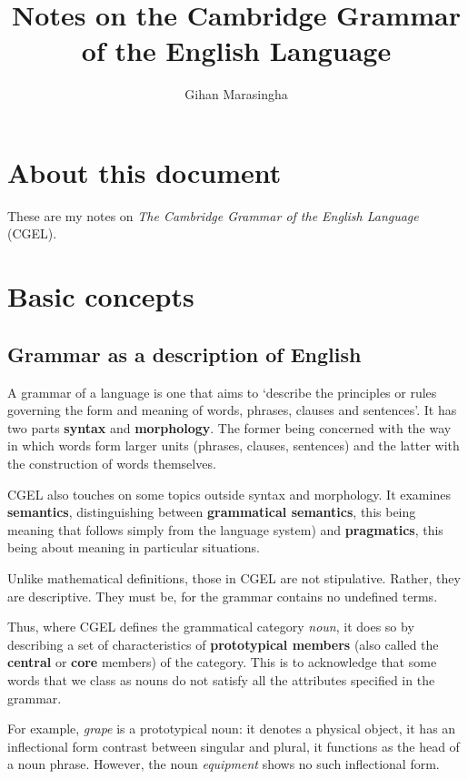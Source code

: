 \documentclass{scrarticle}
\begin{document}
\title{Notes on the Cambridge Grammar of the English Language} \author{Gihan Marasingha}

\maketitle

\section{About this document}

These are my notes on \emph{The Cambridge Grammar of the English Language} (CGEL).

\section{Basic concepts}

\subsection{Grammar as a description of English}

A grammar of a language is one that aims to ‘describe the principles or rules governing the form and
meaning of words, phrases, clauses and sentences’. It has two parts \textbf{syntax} and
\textbf{morphology}. The former being concerned with the way in which words form larger units
(phrases, clauses, sentences) and the latter with the construction of words themselves.

CGEL also touches on some topics outside syntax and morphology. It examines \textbf{semantics},
distinguishing between \textbf{grammatical semantics}, this being meaning that follows simply from
the language system) and \textbf{pragmatics}, this being about meaning in particular situations.

Unlike mathematical definitions, those in CGEL are not stipulative. Rather, they are descriptive.
They must be, for the grammar contains no undefined terms.


Thus, where CGEL defines the grammatical category \emph{noun}, it does so by describing a set of
characteristics of \textbf{prototypical members} (also called the \textbf{central} or \textbf{core}
members) of the category. This is to acknowledge that some words that we class as nouns do not
satisfy all the attributes specified in the grammar.

For example, \emph{grape} is a prototypical noun: it denotes a physical object, it has an
inflectional form contrast between singular and plural, it functions as the head of a noun phrase.
However, the noun \emph{equipment} shows no such inflectional form.
\end{document}
